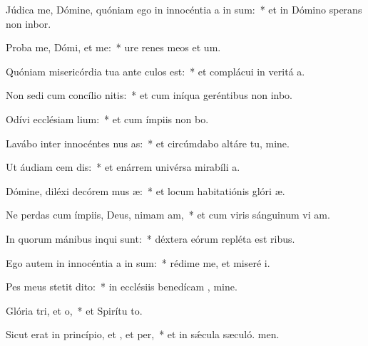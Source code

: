 \item Júdica me, Dómine, quóniam ego in innocéntia a in sum:~* et in Dómino sperans non inbor.
\item Proba me, Dómi, et  me:~* ure renes meos et  um.
\item Quóniam misericórdia tua ante culos  est:~* et complácui in veritá a.
\item Non sedi cum concílio nitis:~* et cum iníqua geréntibus non inbo.
\item Odívi ecclésiam lium:~* et cum ímpiis non bo.
\item Lavábo inter innocéntes nus as:~* et circúmdabo altáre tu, mine.
\item Ut áudiam cem dis:~* et enárrem univérsa mirabíli a.
\item Dómine, diléxi decórem mus æ:~* et locum habitatiónis glóri æ.
\item Ne perdas cum ímpiis, Deus, nimam am,~* et cum viris sánguinum vi am.
\item In quorum mánibus inqui sunt:~* déxtera eórum repléta est ribus.
\item Ego autem in innocéntia a in sum:~* rédime me, et miseré i.
\item Pes meus stetit  dito:~* in ecclésiis benedícam , mine.
\item Glória tri, et o,~* et Spirítu to.
\item Sicut erat in princípio, et , et per,~* et in sǽcula sæculó. men.
